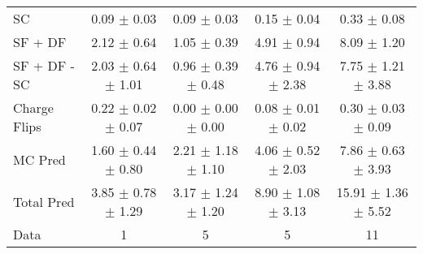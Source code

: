 \begin{tabular}{l|cccc}
                                 SC &  0.09 $\pm$  0.03 &  0.09 $\pm$  0.03 &  0.15 $\pm$  0.04 &  0.33 $\pm$  0.08 \\
                            SF + DF &  2.12 $\pm$  0.64 &  1.05 $\pm$  0.39 &  4.91 $\pm$  0.94 &  8.09 $\pm$  1.20 \\
\hline
                       SF + DF - SC &  2.03 $\pm$  0.64 $\pm$  1.01 &  0.96 $\pm$  0.39 $\pm$  0.48 &  4.76 $\pm$  0.94 $\pm$  2.38 &  7.75 $\pm$  1.21 $\pm$  3.88 \\
\hline\hline
                       Charge Flips &  0.22 $\pm$  0.02 $\pm$  0.07 &  0.00 $\pm$  0.00 $\pm$  0.00 &  0.08 $\pm$  0.01 $\pm$  0.02 &  0.30 $\pm$  0.03 $\pm$  0.09 \\
\hline
                            MC Pred &  1.60 $\pm$  0.44 $\pm$  0.80 &  2.21 $\pm$  1.18 $\pm$  1.10 &  4.06 $\pm$  0.52 $\pm$  2.03 &  7.86 $\pm$  0.63 $\pm$  3.93 \\
\hline
                         Total Pred &  3.85 $\pm$  0.78 $\pm$  1.29 &  3.17 $\pm$  1.24 $\pm$  1.20 &  8.90 $\pm$  1.08 $\pm$  3.13 & 15.91 $\pm$  1.36 $\pm$  5.52 \\
\hline\hline
                               Data &     1 &     5 &     5 &    11 \\
\hline\hline
\end{tabular}

